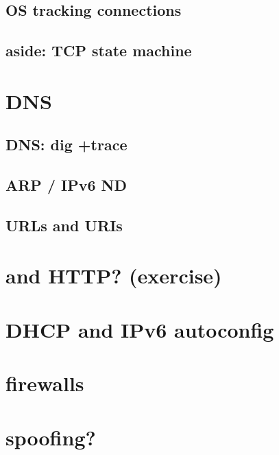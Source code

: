 \subsection{OS tracking connections}


\subsection{aside: TCP state machine}

\section{DNS}


\subsection{DNS: dig +trace}


\subsection{ARP / IPv6 ND}


\subsection{URLs and URIs}


\section{and HTTP? (exercise)}


\section{DHCP and IPv6 autoconfig}



\section{firewalls} %


\section{spoofing?}

